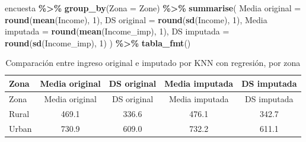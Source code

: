 \documentclass[
  spanish,
  12pt,
]{book}
\newenvironment{Shaded}{\begin{snugshade}}{\end{snugshade}}
\newcommand{\AttributeTok}[1]{\textcolor[rgb]{0.13,0.29,0.53}{#1}}
\newcommand{\DecValTok}[1]{\textcolor[rgb]{0.00,0.00,0.81}{#1}}
\newcommand{\FunctionTok}[1]{\textcolor[rgb]{0.13,0.29,0.53}{\textbf{#1}}}
\newcommand{\NormalTok}[1]{#1}
\newcommand{\OtherTok}[1]{\textcolor[rgb]{0.56,0.35,0.01}{#1}}
\newcommand{\SpecialCharTok}[1]{\textcolor[rgb]{0.81,0.36,0.00}{\textbf{#1}}}
\newcommand{\StringTok}[1]{\textcolor[rgb]{0.31,0.60,0.02}{#1}}
\begin{document}
\begin{Shaded}
\begin{Highlighting}[]
\NormalTok{encuesta }\SpecialCharTok{\%\textgreater{}\%}
  \FunctionTok{group\_by}\NormalTok{(}\AttributeTok{Zona =}\NormalTok{ Zone) }\SpecialCharTok{\%\textgreater{}\%}
  \FunctionTok{summarise}\NormalTok{(}
    \StringTok{\textasciigrave{}}\AttributeTok{Media original}\StringTok{\textasciigrave{}}  \OtherTok{=} \FunctionTok{round}\NormalTok{(}\FunctionTok{mean}\NormalTok{(Income), }\DecValTok{1}\NormalTok{),}
    \StringTok{\textasciigrave{}}\AttributeTok{DS original}\StringTok{\textasciigrave{}}     \OtherTok{=} \FunctionTok{round}\NormalTok{(}\FunctionTok{sd}\NormalTok{(Income), }\DecValTok{1}\NormalTok{),}
    \StringTok{\textasciigrave{}}\AttributeTok{Media imputada}\StringTok{\textasciigrave{}}  \OtherTok{=} \FunctionTok{round}\NormalTok{(}\FunctionTok{mean}\NormalTok{(Income\_imp), }\DecValTok{1}\NormalTok{),}
    \StringTok{\textasciigrave{}}\AttributeTok{DS imputada}\StringTok{\textasciigrave{}}     \OtherTok{=} \FunctionTok{round}\NormalTok{(}\FunctionTok{sd}\NormalTok{(Income\_imp), }\DecValTok{1}\NormalTok{)}
\NormalTok{  ) }\SpecialCharTok{\%\textgreater{}\%} \FunctionTok{tabla\_fmt}\NormalTok{()}
\end{Highlighting}
\end{Shaded}

\begin{longtable}[]{@{}lcccc@{}}
\caption{\label{tab:tab-sesgo-knn-reg-zona}Comparación entre ingreso original e imputado por KNN con regresión, por zona}\tabularnewline
\toprule\noalign{}
Zona & Media original & DS original & Media imputada & DS imputada \\
\midrule\noalign{}
\endfirsthead
\toprule\noalign{}
Zona & Media original & DS original & Media imputada & DS imputada \\
\midrule\noalign{}
\endhead
\bottomrule\noalign{}
\endlastfoot
Rural & 469.1 & 336.6 & 476.1 & 342.7 \\
Urban & 730.9 & 609.0 & 732.2 & 611.1 \\
\end{longtable}
\end{document}
